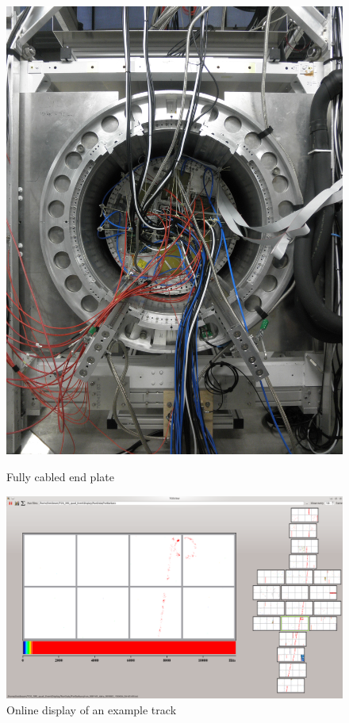 \begin{figure}
	\begin{minipage}{.49\textwidth}
		\includegraphics[width=\textwidth]{Tracker/TPC/Endplate_cabled}
		\caption{Fully cabled end plate}
		\label{fig:TPC:GridPix:endPlate}
	\end{minipage}
	\hfill
	\begin{minipage}{.49\textwidth}
		\includegraphics[width=\textwidth]{Tracker/TPC/onlineTrack}
		\caption{Online display of an example track}
		\label{fig:TPC:GridPix:onlineTrack}
	\end{minipage}
\end{figure}

